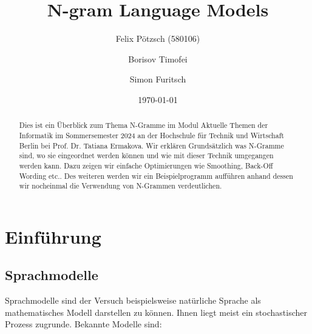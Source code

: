 \documentclass[12pt]{article}
\title{N-gram Language Models}
\author{
  Felix Pötzsch (580106)\\
  \and
  Borisov Timofei \\
  \and
  Simon Furitsch\\
}
\date{\today}
\begin{document}
\maketitle

\begin{abstract}
	Dies ist ein Überblick zum Thema N-Gramme im Modul 
	Aktuelle Themen der Informatik im Sommersemester 2024 an der 
	Hochschule für Technik und Wirtschaft Berlin bei Prof. Dr. Tatiana Ermakova.
	Wir erklären Grundsätzlich was N-Gramme sind, wo sie eingeordnet werden können und wie mit dieser Technik umgegangen werden kann. 
	Dazu zeigen wir einfache Optimierungen wie Smoothing, Back-Off Wording etc.. 
	Des weiteren werden wir ein Beispielprogramm aufführen anhand dessen wir nocheinmal 
	die Verwendung von N-Grammen verdeutlichen.
\end{abstract}

\tableofcontents
\clearpage

\section{Einführung}

\subsection{Sprachmodelle}
Sprachmodelle sind der Versuch beispielsweise natürliche Sprache als mathematisches 
Modell darstellen zu können. Ihnen liegt meist ein stochastischer Prozess zugrunde. 
Bekannte Modelle sind:
\end{document}
